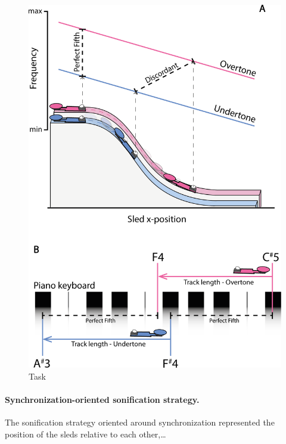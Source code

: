 \documentclass[10pt,a4paper,onecolumn]{article}
\let\oldparagraph\paragraph
\renewcommand{\paragraph}[1]{\oldparagraph{#1}\mbox{}}
\begin{document}
\begin{figure}

{\centering \includegraphics[width=1\linewidth]{figures/task_sonif_illustration} 

}

\caption{Task}\label{fig:task-illustration}
\end{figure}

\hypertarget{synchronization-oriented-sonification-strategy.}{%
\paragraph{Synchronization-oriented sonification strategy.}\label{synchronization-oriented-sonification-strategy.}}

The sonification strategy oriented around synchronization represented the position of the sleds relative to each other,\ldots{}
\end{document}
